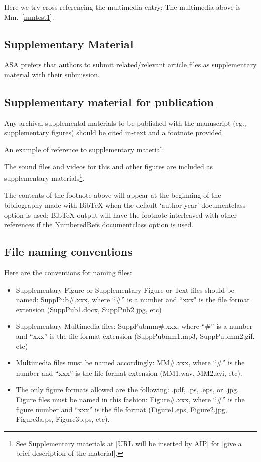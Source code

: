 \documentclass[reprint,NumberedRefs]{JASAnew}
\begin{document}
Here we try cross referencing the multimedia entry: The multimedia
above is Mm.~\ref{mmtest1}.

\subsection{Supplementary Material}
ASA
prefers that authors to submit related/relevant article files as
supplementary material with their submission.

\subsection{Supplementary material for publication}
Any archival supplemental materials to be published with the
manuscript (eg., supplementary figures) should be cited in-text and a footnote provided.

An example of reference to supplementary material:

The sound files and videos for this and other figures
are included as supplementary materials\footnote{See
Supplementary materials at [URL will be inserted by AIP]
for [give a brief description of the material].}.

The contents of the footnote above will appear at the beginning of the
bibliography made with BibTeX when the default `author-year' documentclass option is used;
BibTeX output will have the footnote interleaved with other
references if the NumberedRefs documentclass option is used.

\subsection{File naming conventions}
Here are the conventions for naming files:

\begin{itemize}
\item
Supplementary Figure or
	Supplementary Figure or Text files should be named: SuppPub\#.xxx, where ``\#'' is
	a number and ``xxx" is the file format extension
	(SuppPub1.docx, SuppPub2.jpg, etc)

\item
	Supplementary Multimedia files: SuppPubmm\#.xxx, where ``\#'' is a
	number and ``xxx'' is the file format extension (SuppPubmm1.mp3,
	SuppPubmm2.gif, etc)

\item
Multimedia files must be named accordingly: MM\#.xxx, where ``\#'' is the
number and ``xxx'' is the file format extension (MM1.wav, MM2.avi, etc).

\item
The only figure formats allowed are the following: 
.pdf, .ps, .eps, or .jpg. Figure files must be named in this fashion:
Figure\#.xxx, where ``\#'' is the figure number and ``xxx'' is the file format
(Figure1.eps, Figure2.jpg, Figure3a.ps, Figure3b.ps, etc). 

\end{itemize}
\end{document}
